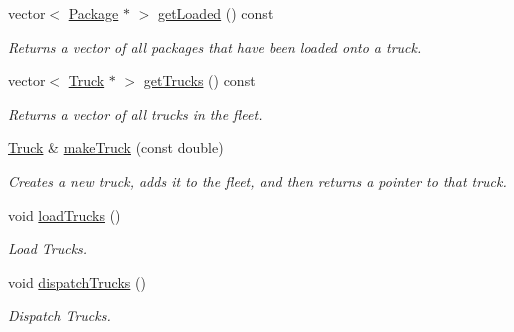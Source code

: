 \begin{DoxyCompactItemize}
vector$<$ \hyperlink{classPackage}{Package} $\ast$ $>$ \hyperlink{classWarehouse_af363d0105923d2d8051358662537b4b2}{get\+Loaded} () const 
\begin{DoxyCompactList}\small\item\em Returns a vector of all packages that have been loaded onto a truck. \end{DoxyCompactList}\item 
vector$<$ \hyperlink{classTruck}{Truck} $\ast$ $>$ \hyperlink{classWarehouse_a206a297180aaacac1328b52aef3c6ffd}{get\+Trucks} () const 
\begin{DoxyCompactList}\small\item\em Returns a vector of all trucks in the fleet. \end{DoxyCompactList}\item 
\hyperlink{classTruck}{Truck} \& \hyperlink{classWarehouse_aa00c0b37409740949cb333482151aa4a}{make\+Truck} (const double)
\begin{DoxyCompactList}\small\item\em Creates a new truck, adds it to the fleet, and then returns a pointer to that truck. \end{DoxyCompactList}\item 
void \hyperlink{classWarehouse_ab3101ac9ac53b20171cf8b01503d5efc}{load\+Trucks} ()
\begin{DoxyCompactList}\small\item\em Load Trucks. \end{DoxyCompactList}\item 
void \hyperlink{classWarehouse_a146380ce3be95fd848bf845f1ca8d7bb}{dispatch\+Trucks} ()
\begin{DoxyCompactList}\small\item\em Dispatch Trucks. \end{DoxyCompactList}\end{DoxyCompactItemize}
